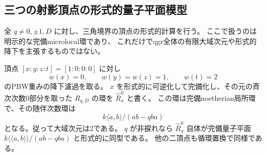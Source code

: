 \subsection{三つの射影頂点の形式的量子平面模型}
\label{subsec:quantum-triangle-vertex}
全 $q\ne0,\pm1,D$ に対し、三角境界の頂点の形式的計算を行う。
ここで扱うのは明示的な完備microlocal環であり、
これだけでqgr全体の有限大域次元や形式的降下を主張するものではない。

\begin{proposition}[頂点の完備microlocal環]
\label{prop:quantum-triangle-formal-vertex}
頂点 $[x:y:z:t]=[1:0:0:0]$ に対し
\[
 w(x)=0,\qquad w(y)=w(z)=1,\qquad w(t)=2
\]
のPBW重みの降下濾過を取る。
$x$ を形式的に可逆化して完備化し、その元の斉次次数0部分を取った
$R_{q,D}$ の環を $\widehat R_x^0$ と書く。
この環は完備noetherian局所環で、その随伴次数環は
\[
 k\langle a,b\rangle/(ab-qba)
\]
となる。従って大域次元は2である。
$q$ が非捩れなら $\widehat R_x^0$ 自体が完備量子平面
$k\langle\!\langle a,b\rangle\!\rangle/(ab-qba)$ と形式的に同型である。
他の二頂点も循環置換で同様である。
\end{proposition}
